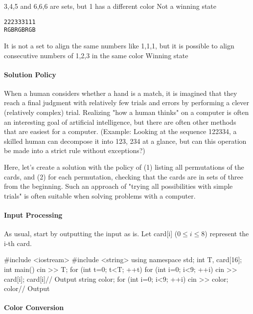 3,4,5 and 6,6,6 are sets, but 1 has a different color \dingright{} Not a winning state

\begin{alltt}
2 2 2 3 3 3 1 1 1
R G B R G B R G B
\end{alltt}

It is not a set to align the same numbers like 1,1,1, but it is possible to align consecutive numbers of 1,2,3 in the same color \dingright{} Winning state

\paragraph{Solution Policy}

When a human considers whether a hand is a match, it is imagined that they reach a final judgment with relatively few trials and errors by performing a clever (relatively complex) trial.
Realizing "how a human thinks" on a computer is often an interesting goal of artificial intelligence, but
there are often other methods that are easiest for a computer.
(Example: Looking at the sequence 122334, a skilled human can decompose it into 123, 234 at a glance, but can this operation be made into a strict rule without exceptions?)

Here, let's create a solution with the policy of (1) listing all permutations of the cards, and (2) for each permutation, checking that the cards are in sets of three from the beginning.
Such an approach of "trying all possibilities with simple trials" is often suitable when solving problems with a computer.

\paragraph{Input Processing}

As usual, start by outputting the input as is.
Let card[i] ($0\le i\le8$) represent the i-th card.

\begin{cbox}
#include <iostream>
#include <string>
using namespace std;
int T, card[16];
int main() {
    cin >> T;
    for (int t=0; t<T; ++t) {
        for (int i=0; i<9; ++i) {
          cin >> card[i];
          card[i]// Output
        }
        string color;
        for (int i=0; i<9; ++i) {
          cin >> color;
          color// Output
        }
    }
}
\end{cbox}

\paragraph{Color Conversion}

